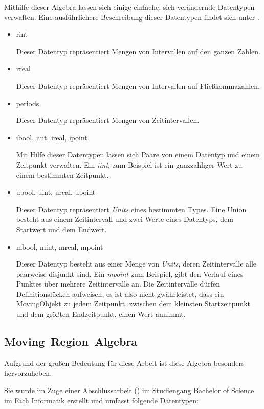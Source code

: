 Mithilfe dieser Algebra lassen sich einige einfache, sich verändernde Datentypen verwalten. Eine ausführlichere Beschreibung dieser Datentypen findet sich unter \cite{FGNS}.
\begin{itemize}
\item rint

Dieser Datentyp repräsentiert Mengen von Intervallen auf den ganzen Zahlen.
\item rreal

Dieser Datentyp repräsentiert Mengen von Intervallen auf Fließkommazahlen.
\item periods

Dieser Datentyp repräsentiert Mengen von Zeitintervallen.
\item ibool, iint, ireal, ipoint

Mit Hilfe dieser Datentypen lassen sich Paare von einem Datentyp und einem Zeitpunkt verwalten. Ein \textit{iint}, zum Beispiel ist ein ganzzahliger Wert zu einem bestimmten Zeitpunkt.

\item ubool, uint, ureal, upoint

Dieser Datentyp repräsentiert \textit{Units} eines bestimmten Types. Eine Union besteht aus einem Zeitintervall und zwei Werte eines Datentyps, dem Startwert und dem Endwert.

\item mbool, mint, mreal, mpoint

Dieser Datentyp besteht aus einer Menge von \textit{Units}, deren Zeitintervalle alle paarweise disjunkt sind. Ein \textit{mpoint} zum Beispiel, gibt den Verlauf eines Punktes über mehrere Zeitintervalle an. Die Zeitintervalle dürfen Definitionslücken aufweisen, es ist also nicht gwährleistet, dass ein MovingObjekt zu jedem Zeitpunkt, zwischen dem kleinsten Startzeitpunkt und dem größten Endzeitpunkt, einen Wert annimmt.

\end{itemize}



\subsection{Moving--Region--Algebra}
Aufgrund der großen Bedeutung für diese Arbeit ist diese Algebra besonders hervorzuheben.

Sie wurde im Zuge einer Abschlussarbeit (\cite{Mue}) im Studiengang Bachelor of Science im Fach Informatik  erstellt und umfasst folgende Datentypen:

